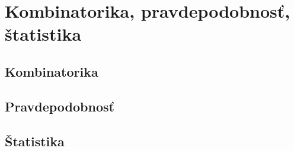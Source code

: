 \chapter{Kombinatorika, pravdepodobnosť, štatistika}

\section{Kombinatorika}

\section{Pravdepodobnosť}

\section{Štatistika}